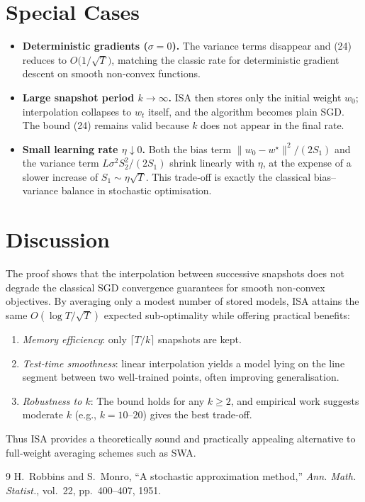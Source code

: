 \documentclass{article}
\begin{document}
\section*{Special Cases}
\begin{itemize}
\item \textbf{Deterministic gradients ($\sigma=0$).}  
    The variance terms disappear and (24) reduces to
    $O\!\big(1/\sqrt{T}\big)$, matching the classic rate for deterministic gradient descent on smooth non‑convex functions.

\item \textbf{Large snapshot period $k\to\infty$.}  
    ISA then stores only the initial weight $w_0$; interpolation collapses to $w_t$ itself, and the algorithm becomes plain SGD. The bound (24) remains valid because $k$ does not appear in the final rate.

\item \textbf{Small learning rate $\eta\downarrow0$.}  
    Both the bias term $\|w_0-w^\star\|^2/(2S_1)$ and the variance term $L\sigma^2 S_2^2/(2S_1)$ shrink linearly with $\eta$, at the expense of a slower increase of $S_1\sim\eta\sqrt{T}$. This trade‑off is exactly the classical bias–variance balance in stochastic optimisation.
\end{itemize}

\section*{Discussion}
The proof shows that the interpolation between successive snapshots does not degrade the classical SGD convergence guarantees for smooth non‑convex objectives. By averaging only a modest number of stored models, ISA attains the same $O(\log T/\sqrt{T})$ expected sub‑optimality while offering practical benefits:
\begin{enumerate}[label=(\roman*)]
\item \emph{Memory efficiency}: only $\lceil T/k\rceil$ snapshots are kept.
\item \emph{Test‑time smoothness}: linear interpolation yields a model lying on the line segment between two well‑trained points, often improving generalisation.
\item \emph{Robustness to $k$}: The bound holds for any $k\ge2$, and empirical work suggests moderate $k$ (e.g., $k=10$–$20$) gives the best trade‑off.
\end{enumerate}
Thus ISA provides a theoretically sound and practically appealing alternative to full‑weight averaging schemes such as SWA.

\begin{thebibliography}{9}
H.~Robbins and S.~Monro, ``A stochastic approximation method,'' \emph{Ann. Math. Statist.}, vol.~22, pp.~400--407, 1951.
\end{thebibliography}
\end{document}
